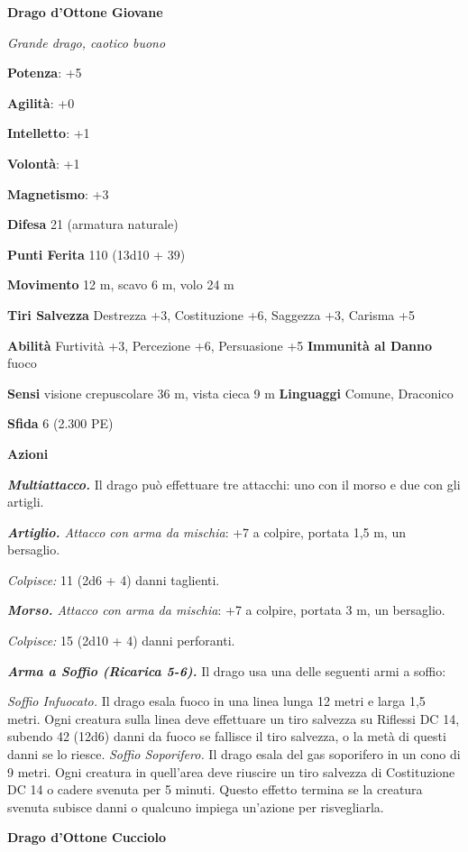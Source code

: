 \begin{multicols}{2}
\textbf{Drago d'Ottone Giovane}

\emph{Grande drago, caotico buono}

\textbf{Potenza}: +5

\textbf{Agilità}: +0

\textbf{Intelletto}: +1

\textbf{Volontà}: +1

\textbf{Magnetismo}: +3

\textbf{Difesa} 21 (armatura naturale)

\textbf{Punti Ferita} 110 (13d10 + 39)

\textbf{Movimento} 12 m, scavo 6 m, volo 24 m

\textbf{Tiri Salvezza} Destrezza +3, Costituzione +6, Saggezza +3,
Carisma +5

\textbf{Abilità} Furtività +3, Percezione +6, Persuasione +5
\textbf{Immunità al Danno} fuoco

\textbf{Sensi} visione crepuscolare 36 m, vista cieca 9 m
\textbf{Linguaggi} Comune, Draconico

\textbf{Sfida} 6 (2.300 PE)

\textbf{Azioni}

\emph{\textbf{Multiattacco.}} Il drago può effettuare tre attacchi: uno
con il morso e due con gli artigli.

\emph{\textbf{Artiglio.} Attacco con arma da mischia}: +7 a colpire,
portata 1,5 m, un bersaglio.

\emph{Colpisce:} 11 (2d6 + 4) danni taglienti.

\emph{\textbf{Morso.} Attacco con arma da mischia}: +7 a colpire,
portata 3 m, un bersaglio.

\emph{Colpisce:} 15 (2d10 + 4) danni perforanti.

\emph{\textbf{Arma a Soffio (Ricarica 5-6).}} Il drago usa una delle
seguenti armi a soffio:

\emph{Soffio Infuocato.} Il drago esala fuoco in una linea lunga 12
metri e larga 1,5 metri. Ogni creatura sulla linea deve effettuare un
tiro salvezza su Riflessi DC 14, subendo 42 (12d6) danni da fuoco se
fallisce il tiro salvezza, o la metà di questi danni se lo riesce.
\emph{Soffio Soporifero.} Il drago esala del gas soporifero in un cono
di 9 metri. Ogni creatura in quell'area deve riuscire un tiro salvezza
di Costituzione DC 14 o cadere svenuta per 5 minuti. Questo effetto
termina se la creatura svenuta subisce danni o qualcuno impiega
un'azione per risvegliarla.

\textbf{Drago d'Ottone Cucciolo}


\end{multicols}
